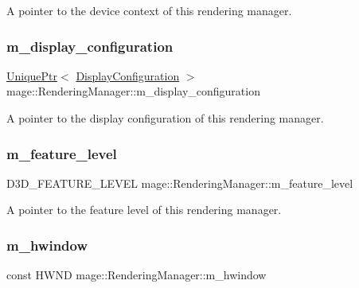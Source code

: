 A pointer to the device context of this rendering manager. \hypertarget{classmage_1_1_rendering_manager_a23a8d0b6bccba3379eafcece28b28090}{}\label{classmage_1_1_rendering_manager_a23a8d0b6bccba3379eafcece28b28090} 
\subsubsection{\texorpdfstring{m\+\_\+display\+\_\+configuration}{m\_display\_configuration}}
{\footnotesize\ttfamily \hyperlink{namespacemage_a3316d7143a973e37adf1110f2e80ca31}{Unique\+Ptr}$<$ \hyperlink{structmage_1_1_display_configuration}{Display\+Configuration} $>$ mage\+::\+Rendering\+Manager\+::m\+\_\+display\+\_\+configuration\hspace{0.3cm}{\ttfamily [private]}}

A pointer to the display configuration of this rendering manager. \hypertarget{classmage_1_1_rendering_manager_a46dc60cd94efc7ad370fd64bd9d6813d}{}\label{classmage_1_1_rendering_manager_a46dc60cd94efc7ad370fd64bd9d6813d} 
\subsubsection{\texorpdfstring{m\+\_\+feature\+\_\+level}{m\_feature\_level}}
{\footnotesize\ttfamily D3\+D\+\_\+\+F\+E\+A\+T\+U\+R\+E\+\_\+\+L\+E\+V\+EL mage\+::\+Rendering\+Manager\+::m\+\_\+feature\+\_\+level\hspace{0.3cm}{\ttfamily [private]}}

A pointer to the feature level of this rendering manager. \hypertarget{classmage_1_1_rendering_manager_a75a2ed9a4bac39c2b03960ceadd6c7dd}{}\label{classmage_1_1_rendering_manager_a75a2ed9a4bac39c2b03960ceadd6c7dd} 
\subsubsection{\texorpdfstring{m\+\_\+hwindow}{m\_hwindow}}
{\footnotesize\ttfamily const H\+W\+ND mage\+::\+Rendering\+Manager\+::m\+\_\+hwindow\hspace{0.3cm}{\ttfamily [private]}}

